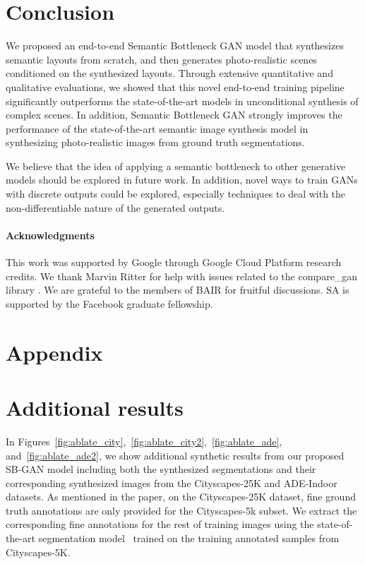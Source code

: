 \documentclass[10pt,twocolumn,letterpaper]{article}
\begin{document}
\vspace{-1mm}
\section{Conclusion}
We proposed an end-to-end Semantic Bottleneck GAN model that synthesizes semantic layouts from scratch, and then generates photo-realistic scenes conditioned on the synthesized layouts. Through extensive quantitative and qualitative evaluations, we showed that this novel end-to-end training pipeline significantly outperforms the state-of-the-art models in unconditional synthesis of complex scenes. In addition, Semantic Bottleneck GAN strongly improves the performance of the state-of-the-art semantic image synthesis model in synthesizing photo-realistic images from ground truth segmentations.

We believe that the idea of applying a semantic bottleneck to other generative models should be explored in future work. In addition, novel ways to train GANs with discrete outputs could be explored, especially techniques to deal with the non-differentiable nature of the generated outputs.

\paragraph{Acknowledgments}
This work was supported by Google through Google Cloud Platform research credits. We thank Marvin Ritter for help with issues related to the compare\_gan library \cite{lucic2018}. We are grateful to the members of BAIR for fruitful discussions. SA is supported by the Facebook graduate fellowship. 


{\small


}

\newpage
\appendix
\section*{Appendix}
\section{Additional results}
In Figures~\ref{fig:ablate_city},~\ref{fig:ablate_city2},~\ref{fig:ablate_ade}, and~\ref{fig:ablate_ade2}, we show additional synthetic results from our proposed SB-GAN model including both the synthesized segmentations and their corresponding synthesized images from the Cityscapes-25K and ADE-Indoor datasets. As mentioned in the paper, on the Cityscapes-25K dataset, fine ground truth annotations are only provided for the Cityscapes-5k subset. We extract the corresponding fine annotations for the rest of training images using the state-of-the-art segmentation model~\cite{DRN, Yu2016} trained on the training annotated samples from Cityscapes-5K. 
\end{document}

